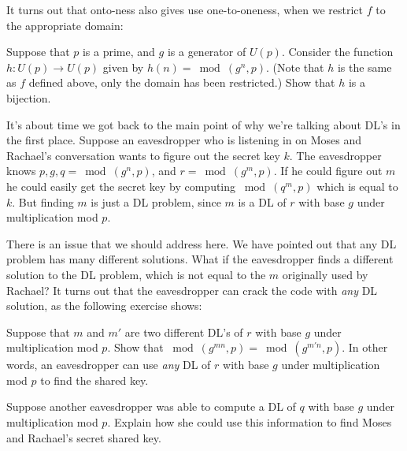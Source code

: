 It turns out that onto-ness also gives use one-to-oneness, when we restrict $f$ to the appropriate domain:

\begin{exercise}\label{exercise:further_crypt:} 
Suppose that $p$ is a prime, and $g$ is a generator of $U(p)$.  Consider the function $h: U(p) \rightarrow U(p)$ given by $h(n) = \bmod(g^n,p)$.  (Note that $h$ is the same as $f$ defined above, only the domain has been restricted.)  Show that $h$ is a bijection.
\end{exercise}

It's about time we got back to the main point of why we're talking about  DL's in the first place.  Suppose an eavesdropper who is listening in on Moses and Rachael's conversation wants to figure out the secret key $k$. 
The eavesdropper knows $p, g, q=\bmod(g^n,p)$, and $r=\bmod(g^m,p)$.   If he could figure out $m$ he could easily get the secret key by computing $\bmod(q^m,p)$ which is equal to $k$.   But finding $m$  is just  a DL problem, since $m$ is a DL of $r$ with base $g$ under multiplication mod $p$.  

There is an issue that we should address here. We have pointed out that any DL problem has many different solutions. What if the eavesdropper finds a different solution to the DL problem, which is not equal to the $m$ originally used by Rachael? It turns out that the eavesdropper can crack the code with \emph{any} DL solution, as the following exercise shows:

\begin{exercise}\label{exercise:further_crypt:DLex3}
Suppose that $m$ and $m'$ are two different DL's of $r$ with base $g$ under multiplication mod $p$.  Show that $\bmod(g^{mn},p)=\bmod(g^{m'n},p)$. In other words, an eavesdropper can use \emph{any} DL of $r$ with base $g$ under multiplication mod $p$ to find the shared key.
\end{exercise}

\begin{exercise}\label{exercise:further_crypt:DLex4}
Suppose another eavesdropper was able to compute a DL of $q$ with base $g$ under multiplication mod $p$.  Explain how she could use this information to find Moses and Rachael's secret shared key.
\end{exercise}

